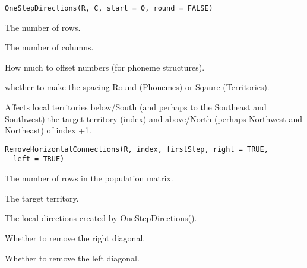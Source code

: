 \documentclass[a4paper]{book}
\begin{document}
%
\begin{Usage}
\begin{verbatim}
OneStepDirections(R, C, start = 0, round = FALSE)
\end{verbatim}
\end{Usage}
%
\begin{Arguments}
\begin{ldescription}
\item[\code{R}] The number of rows.

\item[\code{C}] The number of columns.

\item[\code{start}] How much to offset numbers (for phoneme structures).

\item[\code{round}] whether to make the spacing Round (Phonemes) or Sqaure (Territories).
\end{ldescription}
\end{Arguments}
%
\begin{Description}\relax
Affects local territories below/South (and perhaps to the Southeast and Southwest) the target territory (index) and above/North (perhaps Northwest and Northeast) of index +1.
\end{Description}
%
\begin{Usage}
\begin{verbatim}
RemoveHorizontalConnections(R, index, firstStep, right = TRUE,
  left = TRUE)
\end{verbatim}
\end{Usage}
%
\begin{Arguments}
\begin{ldescription}
\item[\code{R}] The number of rows in the population matrix.

\item[\code{index}] The target territory.

\item[\code{firstStep}] The local directions created by OneStepDirections().

\item[\code{right}] Whether to remove the right diagonal.

\item[\code{left}] Whether to remove the left diagonal.
\end{ldescription}
\end{Arguments}
\end{document}
